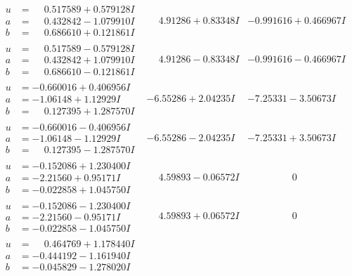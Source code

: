 \documentclass[1p]{elsarticle_modified}
\theoremstyle{definition}
\begin{document}
$$\begin{array}{c|c|c}
\begin{aligned}
u &= \phantom{-}0.517589 + 0.579128 I \\
a &= \phantom{-}0.432842 - 1.079910 I \\
b &= \phantom{-}0.686610 + 0.121861 I\end{aligned}
 & \phantom{-}4.91286 + 0.83348 I & -0.991616 + 0.466967 I \\ \hline\begin{aligned}
u &= \phantom{-}0.517589 - 0.579128 I \\
a &= \phantom{-}0.432842 + 1.079910 I \\
b &= \phantom{-}0.686610 - 0.121861 I\end{aligned}
 & \phantom{-}4.91286 - 0.83348 I & -0.991616 - 0.466967 I \\ \hline\begin{aligned}
u &= -0.660016 + 0.406956 I \\
a &= -1.06148 + 1.12929 I \\
b &= \phantom{-}0.127395 + 1.287570 I\end{aligned}
 & -6.55286 + 2.04235 I & -7.25331 - 3.50673 I \\ \hline\begin{aligned}
u &= -0.660016 - 0.406956 I \\
a &= -1.06148 - 1.12929 I \\
b &= \phantom{-}0.127395 - 1.287570 I\end{aligned}
 & -6.55286 - 2.04235 I & -7.25331 + 3.50673 I \\ \hline\begin{aligned}
u &= -0.152086 + 1.230400 I \\
a &= -2.21560 + 0.95171 I \\
b &= -0.022858 + 1.045750 I\end{aligned}
 & \phantom{-}4.59893 - 0.06572 I & \phantom{-0.000000 } 0 \\ \hline\begin{aligned}
u &= -0.152086 - 1.230400 I \\
a &= -2.21560 - 0.95171 I \\
b &= -0.022858 - 1.045750 I\end{aligned}
 & \phantom{-}4.59893 + 0.06572 I & \phantom{-0.000000 } 0 \\ \hline\begin{aligned}
u &= \phantom{-}0.464769 + 1.178440 I \\
a &= -0.444192 - 1.161940 I \\
b &= -0.045829 - 1.278020 I\end{aligned}

\end{array}$$
\end{document}
